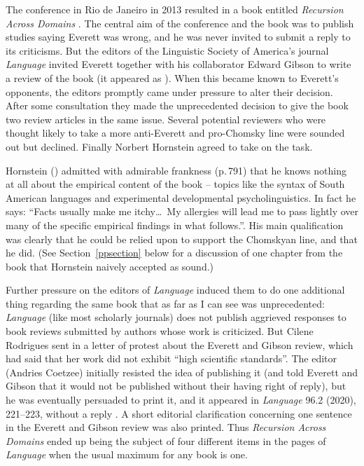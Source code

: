 \documentclass[output=paper,colorlinks,citecolor=brown
]{langscibook}
\begin{document}
The conference in Rio de Janeiro in 2013 resulted in a book entitled
\textit{Recursion Across Domains} \citep{AmMaNeRo18}. The central aim
of the conference and the book was to publish studies saying Everett
was wrong, and he was never invited to submit a reply to its
criticisms. But the editors of the Linguistic Society of America's
journal \textit{Language} invited Everett together with his
collaborator Edward Gibson to write a review of the book (it appeared
as \citealt{EverGibs19}). When this became known to Everett's
opponents, the editors promptly came under pressure to alter their
decision. After some consultation they made the unprecedented decision
to give the book two review articles in the same issue. Several
potential reviewers who were thought likely to take a more anti-Everett
and pro-Chomsky line were sounded out but declined. Finally Norbert
Hornstein agreed to take on the task.

Hornstein (\citeyear{Hornstein19}) admitted with admirable frankness
(p.\,791) that he knows nothing at all about the empirical content
of the book -- topics like the syntax of South American languages
and experimental developmental psycholinguistics. In fact he says:
``Facts usually make me itchy\ldots\ My allergies will lead me to pass
lightly over many of the specific empirical findings in what follows.''.
His main qualification was clearly that he could be relied upon to
support the Chomskyan line, and that he did. (See Section~\ref{ppsection}
below for a discussion of one chapter from the book that Hornstein
naively accepted as sound.)

Further pressure on the editors of \textit{Language} induced them to do
one additional thing regarding the same book that as far as I can see was
unprecedented: \textit{Language} (like most scholarly journals) does not
publish aggrieved responses to book reviews submitted by authors whose
work is criticized.
But Cilene Rodrigues sent in a letter of protest about the Everett and
Gibson review, which had said that her work did not exhibit ``high
scientific standards''. The editor (Andries Coetzee) initially resisted
the idea of publishing it (and told Everett and Gibson that it would
not be published without their having right of reply), but he was eventually
persuaded to print it, and it appeared in \textit{Language} 96.2
(2020), 221--223, without a reply \citep{rodrigues2020response}. A short editorial clarification
concerning one sentence in the Everett and Gibson review was also printed.
Thus \textit{Recursion Across Domains} ended up being the subject of
four different items in the pages of \textit{Language} when the usual
maximum for any book is one.
\end{document}
